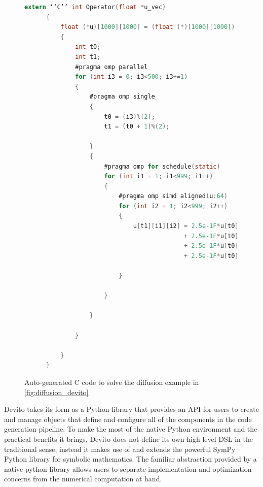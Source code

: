 \documentclass[a4paper,12pt,twoside]{report}
\begin{document}
\begin{figure}[h]
    \begin{lstlisting}[language=C]
      extern ‘‘C’’ int Operator(float *u_vec)
      {
          float (*u)[1000][1000] = (float (*)[1000][1000]) u_vec;
          {
              int t0;
              int t1;
              #pragma omp parallel
              for (int i3 = 0; i3<500; i3+=1)
              {
                  #pragma omp single
                  {
                      t0 = (i3)%(2);
                      t1 = (t0 + 1)%(2);

                  }
                  {
                      #pragma omp for schedule(static)
                      for (int i1 = 1; i1<999; i1++)
                      {
                          #pragma omp simd aligned(u:64)
                          for (int i2 = 1; i2<999; i2++)
                          {
                              u[t1][i1][i2] = 2.5e-1F*u[t0][i1][i2-1]
                                            + 2.5e-1F*u[t0][i1][i2+1]
                                            + 2.5e-1F*u[t0][i1-1][i2]
                                            + 2.5e-1F*u[t0][i1+1][i2];

                          }

                      }

                  }

              }

          }
      }
    \end{lstlisting}
    \caption{Auto-generated C code to solve the diffusion example in \ref{fig:diffusion_devito} \cite{dsl}}
    \label{fig:diffusion_C}
\end{figure}

Devito takes its form as a Python library that provides an API for users to create and manage objects that define and configure all of the components
in the code generation pipeline. To make the most of the native Python environment and the practical benefits it brings, Devito does not define its 
own high-level DSL in the traditional sense, instead it makes use of and extends the powerful SymPy Python library for symbolic mathematics. 
The familiar abstraction provided by a native python library allows users to separate implementation and optimization concerns from the numerical computation at hand.

\end{document}

